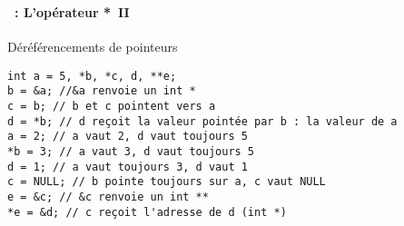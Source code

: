 \begin{frame}[containsverbatim]
  \frametitle{\secname}
  \framesubtitle{\subsecname~: L'opérateur *~II}

  \begin{exampleblock}{Déréférencements de pointeurs}
    \begin{verbatim}
int a = 5, *b, *c, d, **e;
b = &a; //&a renvoie un int * 
c = b; // b et c pointent vers a
d = *b; // d reçoit la valeur pointée par b : la valeur de a
a = 2; // a vaut 2, d vaut toujours 5
*b = 3; // a vaut 3, d vaut toujours 5
d = 1; // a vaut toujours 3, d vaut 1
c = NULL; // b pointe toujours sur a, c vaut NULL
e = &c; // &c renvoie un int **
*e = &d; // c reçoit l'adresse de d (int *)\end{verbatim}
  \end{exampleblock}
\end{frame}

